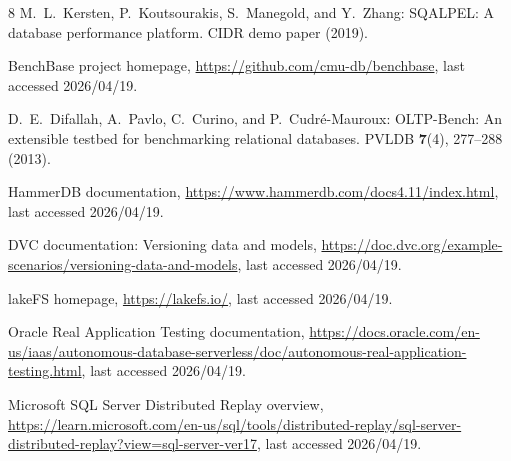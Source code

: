 \documentclass[runningheads]{llncs}
\begin{document}
\begin{thebibliography}{8}
M.~L.~Kersten, P.~Koutsourakis, S.~Manegold, and Y.~Zhang:
SQALPEL: A database performance platform. CIDR demo paper (2019).

BenchBase project homepage, \url{https://github.com/cmu-db/benchbase}, last accessed 2026/04/19.

D.~E.~Difallah, A.~Pavlo, C.~Curino, and P.~Cudr\'{e}-Mauroux:
OLTP-Bench: An extensible testbed for benchmarking relational databases.
PVLDB \textbf{7}(4), 277--288 (2013).

HammerDB documentation, \url{https://www.hammerdb.com/docs4.11/index.html}, last accessed 2026/04/19.

DVC documentation: Versioning data and models,
\url{https://doc.dvc.org/example-scenarios/versioning-data-and-models}, last accessed 2026/04/19.

lakeFS homepage, \url{https://lakefs.io/}, last accessed 2026/04/19.

Oracle Real Application Testing documentation,
\url{https://docs.oracle.com/en-us/iaas/autonomous-database-serverless/doc/autonomous-real-application-testing.html}, last accessed 2026/04/19.

Microsoft SQL Server Distributed Replay overview,
\url{https://learn.microsoft.com/en-us/sql/tools/distributed-replay/sql-server-distributed-replay?view=sql-server-ver17}, last accessed 2026/04/19.
\end{thebibliography}
\end{document}
